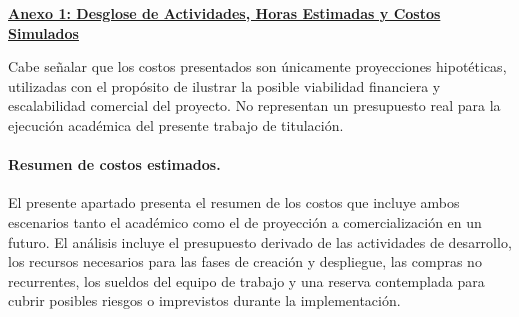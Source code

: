 \begin{flushleft} \href{https://correoipn-my.sharepoint.com/:x:/g/personal/jjuarezs2101_alumno_ipn_mx/EeARJhF0AGFBo4IQh_We0k0B-ua3S89CAl0FnxOvV31OnA?e=ynKN14}{\textbf{Anexo 1: Desglose de Actividades, Horas Estimadas y Costos Simulados}} \end{flushleft}

Cabe señalar que los costos presentados son únicamente proyecciones hipotéticas, utilizadas con el propósito de ilustrar la posible viabilidad financiera y escalabilidad comercial del proyecto. No representan un presupuesto real para la ejecución académica del presente trabajo de titulación.

\paragraph{\textbf{Resumen de costos estimados.}}
El presente apartado presenta el resumen de los costos que incluye ambos escenarios tanto el académico como el de proyección a comercialización en un futuro. El análisis incluye el presupuesto derivado de las actividades de desarrollo, los recursos necesarios para las fases de creación y despliegue, las compras no recurrentes, los sueldos del equipo de trabajo y una reserva contemplada para cubrir posibles riesgos o imprevistos durante la implementación.

\begin{table}[H]
	\centering
	\renewcommand{\arraystretch}{1.5}
	\setlength{\tabcolsep}{12pt}
	\caption{Resumen de costos estimados para el desarrollo y despliegue en el escenario académico.}
	\label{tab:costos_academico}
\end{table}

